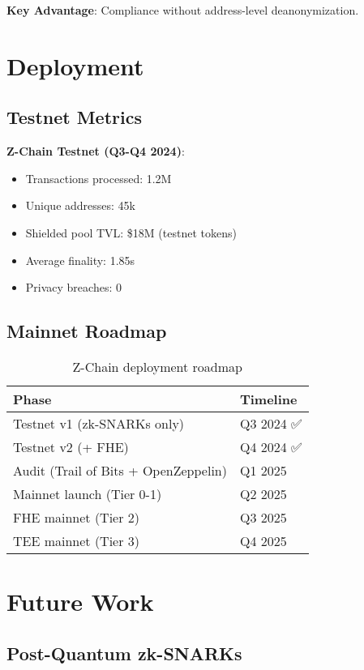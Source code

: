 \documentclass[11pt]{article}
\begin{document}
\textbf{Key Advantage}: Compliance without address-level deanonymization.

\section{Deployment}

\subsection{Testnet Metrics}

\textbf{Z-Chain Testnet (Q3-Q4 2024)}:
\begin{itemize}[leftmargin=1.1em]
  \item Transactions processed: 1.2M
  \item Unique addresses: 45k
  \item Shielded pool TVL: \$18M (testnet tokens)
  \item Average finality: 1.85s
  \item Privacy breaches: 0
\end{itemize}

\subsection{Mainnet Roadmap}

\begin{table}[h]
\centering
\begin{tabular}{ll}
\toprule
Phase & Timeline \\
\midrule
Testnet v1 (zk-SNARKs only) & Q3 2024 ✅ \\
Testnet v2 (+ FHE) & Q4 2024 ✅ \\
Audit (Trail of Bits + OpenZeppelin) & Q1 2025 🔨 \\
Mainnet launch (Tier 0-1) & Q2 2025 🔄 \\
FHE mainnet (Tier 2) & Q3 2025 🔄 \\
TEE mainnet (Tier 3) & Q4 2025 🔄 \\
\bottomrule
\end{tabular}
\caption{Z-Chain deployment roadmap}
\end{table}

\section{Future Work}

\subsection{Post-Quantum zk-SNARKs}
\end{document}
